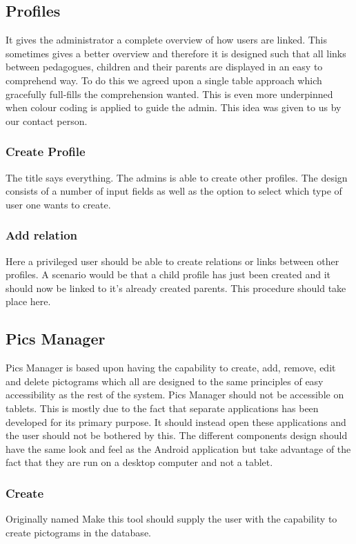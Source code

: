 \subsection{Profiles}
It gives the administrator a complete overview of how users are linked. This sometimes gives a better overview and therefore it is designed such that all links between pedagogues, children and their parents are displayed in an easy to comprehend way. To do this we agreed upon a single table approach which gracefully full-fills the comprehension wanted. This is even more underpinned when colour coding is applied to guide the admin. This idea was given to us by our contact person.

\subsubsection*{Create Profile}
The title says everything. The admins is able to create other profiles. The design consists of a number of input fields as well as the option to select which type of user one wants to create.

\subsubsection*{Add relation}
Here a privileged user should be able to create relations or links between other profiles. A scenario would be that a child profile has just been created and it should now be linked to it's already created parents. This procedure should take place here.

\subsection{Pics Manager}
Pics Manager is based upon having the capability to create, add, remove, edit and delete pictograms which all are designed to the same principles of easy accessibility as the rest of the system. Pics Manager should not be accessible on tablets. This is mostly due to the fact that separate applications has been developed for its primary purpose. It should instead open these applications and the user should not be bothered by this. The different components design should have the same look and feel as the Android application but take advantage of the fact that they are run on a desktop computer and not a tablet.
\subsubsection*{Create}
Originally named Make this tool should supply the user with the capability to create pictograms in the database.
